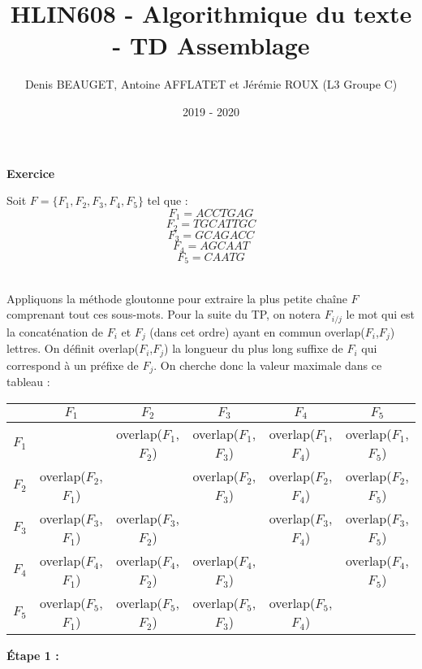 \documentclass[11pt,letterpaper]{article}
\author{Denis BEAUGET, Antoine AFFLATET et Jérémie ROUX (L3 Groupe C)}
\title{HLIN608 - Algorithmique du texte - TD Assemblage}
\date{2019 - 2020}
\newcommand{\exo}[1]{\Large \textbf{Exercice \numprint{#1}} \vspace{10px} \normalsize}
\begin{document}
\maketitle


\exo{1}


Soit $F = \{F_1,F_2,F_3,F_4,F_5\}$ tel que :\\
$$F_1 = ACCTGAG$$
$$F_2 = TGCATTGC$$
$$F_3 = GCAGACC$$
$$F_4 = AGCAAT$$
$$F_5 = CAATG$$\\

\vspace{-10px}

Appliquons la méthode gloutonne pour extraire la plus petite chaîne $F$ comprenant tout ces sous-mots. Pour la suite du TP, on notera $F_{i/j}$ le mot qui est la concaténation de $F_i$ et $F_j$ (dans cet ordre) ayant en commun overlap($F_i$,$F_j$) lettres. On définit overlap($F_i$,$F_j$) la longueur du plus long suffixe de $F_i$ qui correspond à un préfixe de $F_j$. On cherche donc la valeur maximale dans ce tableau :\\

\begin{center}
\begin{tabular}{|*{6}{c|}}
    \hline
    & $F_1$ & $F_2$ & $F_3$ & $F_4$ & $F_5$\\
    \hline
    $F_1$ & & overlap($F_1$,$F_2$) & overlap($F_1$,$F_3$) & overlap($F_1$,$F_4$) & overlap($F_1$,$F_5$)\\
    \hline
    $F_2$  & overlap($F_2$,$F_1$) & & overlap($F_2$,$F_3$) & overlap($F_2$,$F_4$) & overlap($F_2$,$F_5$)\\
    \hline
    $F_3$  & overlap($F_3$,$F_1$) & overlap($F_3$,$F_2$) & & overlap($F_3$,$F_4$) & overlap($F_3$,$F_5$)\\
    \hline
    $F_4$ & overlap($F_4$,$F_1$) & overlap($F_4$,$F_2$) & overlap($F_4$,$F_3$) & & overlap($F_4$,$F_5$)\\
    \hline
    $F_5$ & overlap($F_5$,$F_1$) & overlap($F_5$,$F_2$) & overlap($F_5$,$F_3$) & overlap($F_5$,$F_4$) &\\
    \hline
\end{tabular}
\end{center}

\vspace{10px}

\textbf{Étape 1 :}\\

\vspace{-20px}
\end{document}
